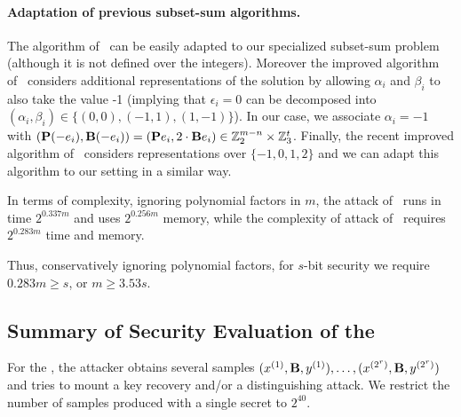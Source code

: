 \paragraph{Adaptation of previous subset-sum algorithms.}
The algorithm of~\cite{Howgrave-GrahamJ10} can be easily adapted
to our specialized subset-sum problem (although it is not defined over the integers).
Moreover the improved algorithm of~\cite{BeckerCJ11} considers additional representations
of the solution by allowing $\alpha_i$ and $\beta_i$ to also take the value -1
(implying that $\epsilon_i = 0$ can be decomposed into
$(\alpha_i,\beta_i) \in \{(0,0),(-1,1),(1,-1)\}$).
In our case, we associate $\alpha_i = -1$
with $(\mat{P}(-e_i), \mat{B}(-e_i)) = (\mat{P}e_i, 2 \cdot \mat{B}e_i)  \in \Z_2^{m-n} \times \Z_3^t$.
Finally, the recent improved algorithm of~\cite{BonnetainBSS20} considers representations over
$\{-1,0,1,2\}$ and we can adapt this algorithm to our setting in a similar way.

In terms of complexity, ignoring polynomial factors in $m$,
the attack of~\cite{Howgrave-GrahamJ10} runs in time $2^{0.337m}$ and uses $2^{0.256m}$ memory,
while the complexity of attack of~\cite{BonnetainBSS20} requires $2^{0.283m}$ time and memory.

Thus, conservatively ignoring polynomial factors, for $s$-bit security we require $0.283m \geq s$, or $m \geq 3.53 s$.

\subsection{Summary of Security Evaluation of the \ttwPRF}

For the \ttwPRF, the attacker obtains several samples 
$(x^{(1)},\mat{B},y^{(1)}) ,\ldots, (x^{(2^r)},
\mat{B},y^{(2^r)})$
and tries to
mount a key recovery and/or a distinguishing attack.
We restrict the number of samples produced with a single secret to $2^{40}$.

